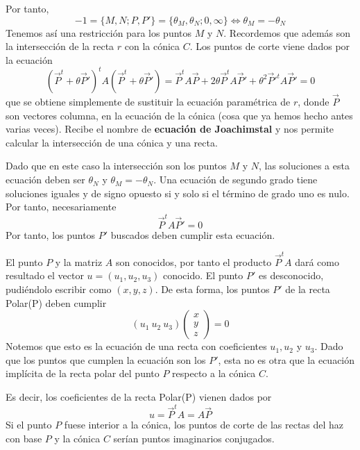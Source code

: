 Por tanto, 
\begin{equation}
-1=\{M,N;P,P'\}=\{\theta_M,\theta_N;0,\infty\}\Leftrightarrow \theta_M=-\theta_N
\end{equation}
Tenemos así una restricción para los puntos $M$ y $N$. Recordemos que además son la intersección de la recta $r$ con la cónica $C$. Los puntos de corte viene dados por la ecuación
\begin{equation}
(\vec{P}^t+\theta \vec{P}')^tA(\vec{P}^t+\theta \vec{P}')=\vec{P}^tA\vec{P}+2\theta \vec{P}^tA\vec{P}'+\theta^2\vec{P}'^tA\vec{P}'=0
\end{equation}
que se obtiene simplemente de sustituir la ecuación paramétrica de $r$, donde $\vec{P}$ son vectores columna, en la ecuación de la cónica (cosa que ya hemos hecho antes varias veces). Recibe el nombre de \textbf{ecuación de Joachimstal} y nos permite calcular la intersección de una cónica y una recta.

Dado que en este caso la intersección son los puntos $M$ y $N$, las soluciones a esta ecuación deben ser $\theta_N$ y $\theta_M=-\theta_N$. Una ecuación de segundo grado tiene soluciones iguales y de signo opuesto si y solo si el término de grado uno es nulo. Por tanto, necesariamente
\begin{equation}\label{C8:eq_puntos_recta_polar}
\vec{P}^tA\vec{P}'=0
\end{equation}
Por tanto, los puntos $P'$ buscados deben cumplir esta ecuación.

El punto $P$ y la matriz $A$ son conocidos, por tanto el producto $\vec{P}^tA$ dará como resultado el vector $u=(u_1, u_2,u_3)$ conocido. El punto $P'$ es desconocido, pudiéndolo escribir como $(x, y,z)$. De esta forma, los puntos $P'$ de la recta Polar(P) deben cumplir
\begin{equation}
(u_1 \ u_2 \ u_3)
\left( \begin{array}{c}
x\\ y\\ z
\end{array}\right) =0
\end{equation}
Notemos que esto es la ecuación de una recta con coeficientes $u_1,u_2$ y $u_3$. Dado que los puntos que cumplen la ecuación son los $P'$, esta no es otra que la ecuación implícita de la recta polar del punto $P$ respecto a la cónica $C$.

Es decir, los coeficientes de la recta Polar(P) vienen dados por
\begin{equation}
u=\vec{P}^tA=A\vec{P}
\end{equation}
Si el punto $P$ fuese interior a la cónica, los puntos de corte de las rectas del haz con base $P$ y la cónica $C$ serían puntos imaginarios conjugados.

